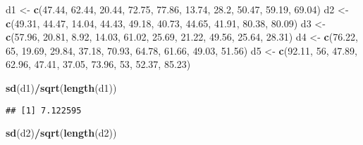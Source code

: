\documentclass[
]{article}
\newenvironment{Shaded}{\begin{snugshade}}{\end{snugshade}}
\newcommand{\DecValTok}[1]{\textcolor[rgb]{0.00,0.00,0.81}{#1}}
\newcommand{\FloatTok}[1]{\textcolor[rgb]{0.00,0.00,0.81}{#1}}
\newcommand{\FunctionTok}[1]{\textcolor[rgb]{0.13,0.29,0.53}{\textbf{#1}}}
\newcommand{\NormalTok}[1]{#1}
\newcommand{\OtherTok}[1]{\textcolor[rgb]{0.56,0.35,0.01}{#1}}
\newcommand{\SpecialCharTok}[1]{\textcolor[rgb]{0.81,0.36,0.00}{\textbf{#1}}}
\begin{document}
\begin{Shaded}
\begin{Highlighting}[]
\NormalTok{d1 }\OtherTok{\textless{}{-}} \FunctionTok{c}\NormalTok{(}\FloatTok{47.44}\NormalTok{, }\FloatTok{62.44}\NormalTok{, }\FloatTok{20.44}\NormalTok{, }\FloatTok{72.75}\NormalTok{, }\FloatTok{77.86}\NormalTok{, }\FloatTok{13.74}\NormalTok{, }\FloatTok{28.2}\NormalTok{, }\FloatTok{50.47}\NormalTok{, }\FloatTok{59.19}\NormalTok{, }\FloatTok{69.04}\NormalTok{)}
\NormalTok{d2 }\OtherTok{\textless{}{-}} \FunctionTok{c}\NormalTok{(}\FloatTok{49.31}\NormalTok{, }\FloatTok{44.47}\NormalTok{, }\FloatTok{14.04}\NormalTok{, }\FloatTok{44.43}\NormalTok{, }\FloatTok{49.18}\NormalTok{, }\FloatTok{40.73}\NormalTok{, }\FloatTok{44.65}\NormalTok{, }\FloatTok{41.91}\NormalTok{, }\FloatTok{80.38}\NormalTok{, }\FloatTok{80.09}\NormalTok{)}
\NormalTok{d3 }\OtherTok{\textless{}{-}} \FunctionTok{c}\NormalTok{(}\FloatTok{57.96}\NormalTok{, }\FloatTok{20.81}\NormalTok{, }\FloatTok{8.92}\NormalTok{, }\FloatTok{14.03}\NormalTok{, }\FloatTok{61.02}\NormalTok{, }\FloatTok{25.69}\NormalTok{, }\FloatTok{21.22}\NormalTok{, }\FloatTok{49.56}\NormalTok{, }\FloatTok{25.64}\NormalTok{, }\FloatTok{28.31}\NormalTok{)}
\NormalTok{d4 }\OtherTok{\textless{}{-}} \FunctionTok{c}\NormalTok{(}\FloatTok{76.22}\NormalTok{, }\DecValTok{65}\NormalTok{, }\FloatTok{19.69}\NormalTok{, }\FloatTok{29.84}\NormalTok{, }\FloatTok{37.18}\NormalTok{, }\FloatTok{70.93}\NormalTok{, }\FloatTok{64.78}\NormalTok{, }\FloatTok{61.66}\NormalTok{, }\FloatTok{49.03}\NormalTok{, }\FloatTok{51.56}\NormalTok{)}
\NormalTok{d5 }\OtherTok{\textless{}{-}} \FunctionTok{c}\NormalTok{(}\FloatTok{92.11}\NormalTok{, }\DecValTok{56}\NormalTok{, }\FloatTok{47.89}\NormalTok{, }\FloatTok{62.96}\NormalTok{, }\FloatTok{47.41}\NormalTok{, }\FloatTok{37.05}\NormalTok{, }\FloatTok{73.96}\NormalTok{, }\DecValTok{53}\NormalTok{, }\FloatTok{52.37}\NormalTok{, }\FloatTok{85.23}\NormalTok{)}

\FunctionTok{sd}\NormalTok{(d1)}\SpecialCharTok{/}\FunctionTok{sqrt}\NormalTok{(}\FunctionTok{length}\NormalTok{(d1))}
\end{Highlighting}
\end{Shaded}

\begin{verbatim}
## [1] 7.122595
\end{verbatim}

\begin{Shaded}
\begin{Highlighting}[]
\FunctionTok{sd}\NormalTok{(d2)}\SpecialCharTok{/}\FunctionTok{sqrt}\NormalTok{(}\FunctionTok{length}\NormalTok{(d2))}
\end{Highlighting}
\end{Shaded}
\end{document}
